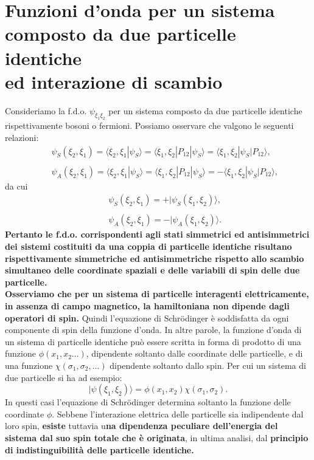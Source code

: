 \documentclass[a4paper,12pt,oneside]{book}
\begin{document}
\section{Funzioni d'onda per un sistema\\ composto da due particelle identiche\\ ed interazione di scambio}
Consideriamo la f.d.o. $\psi_{\xi_1 \xi_2}$ per un sistema composto da due particelle identiche rispettivamente bosoni o fermioni. Possiamo osservare che valgono le seguenti relazioni:
\begin{eqnarray}
& &\psi_S (\xi_2, \xi_1) =\langle \xi_2, \xi_1|\psi_S\rangle= \langle \xi_1, \xi_2|P_{12}|\psi_S\rangle=\langle \xi_1, \xi_2|\psi_S|P_{12}\rangle  , \\ 
\nonumber \\
& & \psi_A (\xi_2, \xi_1) =\langle \xi_2, \xi_1|\psi_S\rangle= \langle \xi_1, \xi_2|P_{12}|\psi_S\rangle=-\langle \xi_1, \xi_2|\psi_S|P_{12}\rangle ,
\end{eqnarray}
da cui
\begin{eqnarray}
& &\psi_S (\xi_2, \xi_1) = +|\psi_S(\xi_1, \xi_2)\rangle ,\\
 \nonumber \\
& &\psi_A (\xi_2, \xi_1) = -|\psi_A(\xi_1, \xi_2)\rangle .
\end{eqnarray}
\textbf{Pertanto le f.d.o. corrispondenti agli stati simmetrici ed antisimmetrici dei sistemi costituiti da una coppia di particelle identiche risultano rispettivamente simmetriche ed antisimmetriche rispetto allo scambio simultaneo delle coordinate spaziali e delle variabili di spin delle due particelle.}\\
\textbf{Osserviamo che per un sistema di particelle interagenti elettricamente, in assenza di campo magnetico, la hamiltoniana non dipende dagli operatori di spin.} Quindi l'equazione di Schr\"{o}dinger è soddisfatta da ogni componente di spin della funzione d'onda. In altre parole, la funzione d'onda di un sistema di particelle identiche può essere scritta in forma di prodotto di una funzione $\phi(x_1, x_2...)$, dipendente soltanto dalle coordinate delle particelle, e di una funzione $\chi(\sigma_1,\sigma_2,...)$ dipendente soltanto dallo spin. Per cui un sistema di due particelle si ha ad esempio:
\begin{equation}
|\psi(\xi_1, \xi_2)\rangle= \phi(x_1, x_2)\chi(\sigma_1, \sigma_2) .
\end{equation}
In questi casi l'equazione di Schr\"{o}dinger determina soltanto la funzione delle coordinate $\phi$. Sebbene l'interazione elettrica delle particelle sia indipendente dal loro spin, \textbf{esiste} tuttavia u\textbf{na dipendenza peculiare dell'energia del sistema dal suo spin totale che è originata}, in ultima analisi, dal \textbf{principio di indistinguibilità delle particelle identiche.}\\
\end{document}
